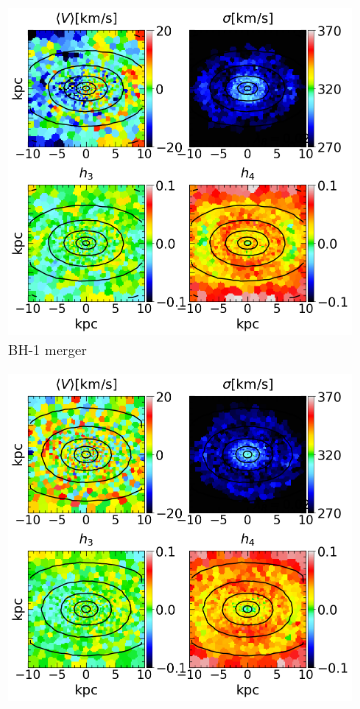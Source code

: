 \documentclass[english, oneside]{HYgradu}
\begin{document}
\begin{figure}
	\centering
	\begin{subfigure}[b]{0.49\textwidth}
		\includegraphics[width=\textwidth]{BH_1.png}
		\caption{BH-1 merger}
	\end{subfigure}
	\begin{subfigure}[b]{0.49\textwidth}
		\includegraphics[width=\textwidth]{BH_2.png}

\end{subfigure}
\end{figure}
\end{document}
